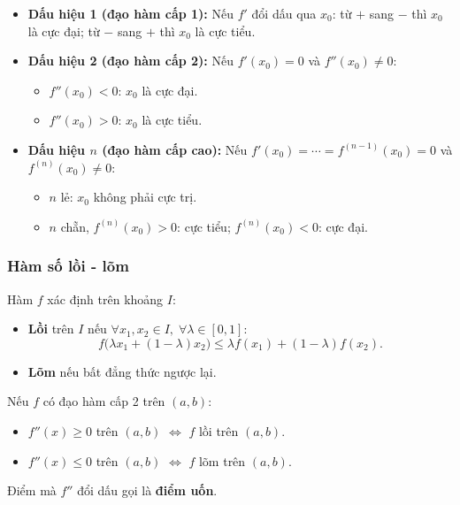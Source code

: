 \documentclass[12pt,a4paper]{article}
\begin{document}
\begin{dinhly}[title={Điều kiện đủ cực trị}]
  \begin{itemize}
    \item \textbf{Dấu hiệu 1 (đạo hàm cấp 1):} Nếu $f'$ đổi dấu qua $x_0$: từ $+$ sang $-$ thì $x_0$ là cực đại; từ $-$ sang $+$ thì $x_0$ là cực tiểu.
    \item \textbf{Dấu hiệu 2 (đạo hàm cấp 2):} Nếu $f'(x_0) = 0$ và $f''(x_0) \ne 0$:
      \begin{itemize}
        \item $f''(x_0) < 0$: $x_0$ là cực đại.
        \item $f''(x_0) > 0$: $x_0$ là cực tiểu.
      \end{itemize}
    \item \textbf{Dấu hiệu $n$ (đạo hàm cấp cao):} Nếu $f'(x_0) = \cdots = f^{(n-1)}(x_0) = 0$ và $f^{(n)}(x_0) \ne 0$:
      \begin{itemize}
        \item $n$ lẻ: $x_0$ không phải cực trị.
        \item $n$ chẵn, $f^{(n)}(x_0) > 0$: cực tiểu; $f^{(n)}(x_0) < 0$: cực đại.
      \end{itemize}
  \end{itemize}
\end{dinhly}

\subsubsection{Hàm số lồi - lõm}

\begin{dinhnghia}
  Hàm $f$ xác định trên khoảng $I$:
  \begin{itemize}
    \item \textbf{Lồi} trên $I$ nếu $\forall x_1, x_2 \in I,\; \forall \lambda \in [0,1]$:
      \[
        f\bigl(\lambda x_1 + (1-\lambda)x_2\bigr) \le \lambda f(x_1) + (1-\lambda) f(x_2).
      \]
    \item \textbf{Lõm} nếu bất đẳng thức ngược lại.
  \end{itemize}
\end{dinhnghia}

\begin{dinhly}
  Nếu $f$ có đạo hàm cấp 2 trên $(a,b)$:
  \begin{itemize}
    \item $f''(x) \ge 0$ trên $(a,b)$ $\Leftrightarrow$ $f$ lồi trên $(a,b)$.
    \item $f''(x) \le 0$ trên $(a,b)$ $\Leftrightarrow$ $f$ lõm trên $(a,b)$.
  \end{itemize}
  Điểm mà $f''$ đổi dấu gọi là \textbf{điểm uốn}.
\end{dinhly}
\end{document}
